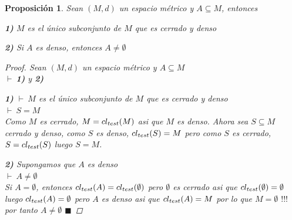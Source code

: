 \documentclass[oneside]{book} %
\theoremstyle{Teorema}
\newtheorem{Proposicion}[Definicion]{Proposición}
\theoremstyle{Ejemplos}
\theoremstyle{[Obs]}
\def \test {test}
\newcommand{\cerradura}[2][\test]{\ifx \test #1 {\overline{#2}} \else {cl_{#1}(#2)} \fi} %
\renewcommand{\{}{\left\lbrace} %
\renewcommand{\}}{\right\rbrace} %
\renewcommand{\sc}{\subseteq} %
\renewcommand{\qed}{$\blacksquare$} %
\newcommand{\pd}{$\vdash\ $} %
\renewcommand{\c}{$!!!\ $} %
\begin{document}
			\begin{Proposicion}\setlength{\parindent}{0em}

				Sean $(M, d)$ un espacio métrico y $A \sc M$, entonces 
				
				\textbf{1)} $M$ es el único subconjunto de $M$ que es cerrado y denso

				\textbf{2)} Si $A$ es denso, entonces $A \neq \emptyset$

				\begin{proof}
					
					Sean $(M, d)$ un espacio métrico y $A \sc M$ \\ 
					\pd \textbf{1)} y \textbf{2)}

					\textbf{1)} \pd $M$ es el único subconjunto de $M$ que es cerrado y denso \\  
					\pd $S = M$ \\ 
					Como $M$ es cerrado, $M = \cerradura{M}$ asi que $M$ es denso. Ahora sea $S \sc M$ cerrado y denso, como $S$ es denso, $\cerradura{S} = M$ pero como $S$ es cerrado, $S = \cerradura{S}$ luego $S = M$.

					\textbf{2)} Supongamos que $A$ es denso \\ 
					\pd $A \neq \emptyset$ \\ 
					Si $A = \emptyset$, entonces $\cerradura{A} = \cerradura{\emptyset}$ pero $\emptyset$ es cerrado asi que $\cerradura{\emptyset} = \emptyset$ luego $\cerradura{A} = \emptyset$ pero $A$ es denso asi que $\cerradura{A} = M$ por lo que $M = \emptyset$ \c por tanto $A \neq \emptyset$ \qed

				\end{proof}

			\end{Proposicion}
\end{document}
